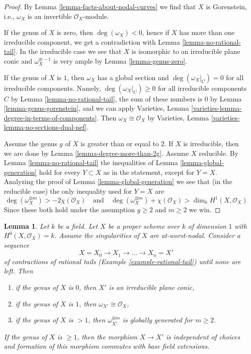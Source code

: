 \documentclass{stacks-project}
\theoremstyle{plain}
\newtheorem{lemma}[subsection]{Lemma}
\theoremstyle{definition}
\theoremstyle{remark}
\numberwithin{equation}{subsection}
\begin{document}
\begin{proof}
By Lemma \ref{lemma-facts-about-nodal-curves} we find that $X$ is
Gorenstein, i.e., $\omega_X$ is an invertible $\mathcal{O}_X$-module.

\medskip\noindent
If the genus of $X$ is zero, then $\deg(\omega_X) < 0$, hence if
$X$ has more than one irreducible component, we get a contradiction
with Lemma \ref{lemma-no-rational-tail}. In the irreducible case
we see that $X$ is isomorphic to an irreducible plane conic and
$\omega_X^{\otimes -1}$ is very ample by Lemma \ref{lemma-genus-zero}.

\medskip\noindent
If the genus of $X$ is $1$, then $\omega_X$ has a global section and
$\deg(\omega_X|_C) = 0$ for all irreducible components.
Namely, $\deg(\omega_X|_C) \geq 0$ for all irreducible components $C$
by Lemma \ref{lemma-no-rational-tail}, the sum of these numbers is
$0$ by Lemma \ref{lemma-genus-gorenstein}, and we can apply
Varieties, Lemma \ref{varieties-lemma-degree-in-terms-of-components}.
Then $\omega_X \cong \mathcal{O}_X$ by
Varieties, Lemma \ref{varieties-lemma-no-sections-dual-nef}.

\medskip\noindent
Assume the genus $g$ of $X$ is greater than or equal to $2$.
If $X$ is irreducible, then we are done by
Lemma \ref{lemma-degree-more-than-2g}.
Assume $X$ reducible.
By Lemma \ref{lemma-no-rational-tail} the
inequalities of Lemma \ref{lemma-global-generation}
hold for every $Y \subset X$ as in the statement, except for
$Y = X$. Analyzing the proof of Lemma \ref{lemma-global-generation}
we see that (in the reducible case) the only inequality
used for $Y = X$ are
$$
\deg(\omega_X^{\otimes m}) > -2 \chi(\mathcal{O}_X)
\quad\text{and}\quad
\deg(\omega_X^{\otimes m}) + \chi(\mathcal{O}_X) > \dim_k H^1(X, \mathcal{O}_X)
$$
Since these both hold under the assumption $g \geq 2$ and $m \geq 2$ we win.
\end{proof}

\begin{lemma}
\label{lemma-contracting-rational-tails}
Let $k$ be a field. Let $X$ be a proper scheme over $k$ of dimension $1$
with $H^0(X, \mathcal{O}_X) = k$. Assume the singularities of $X$ are
at-worst-nodal. Consider a sequence
$$
X = X_0 \to X_1 \to \ldots \to X_n = X'
$$
of contractions of rational tails (Example \ref{example-rational-tail})
until none are left. Then
\begin{enumerate}
\item if the genus of $X$ is $0$, then $X'$ is an irreducible
plane conic,
\item if the genus of $X$ is $1$, then $\omega_{X'} \cong \mathcal{O}_X$,
\item if the genus of $X$ is $> 1$, then
$\omega_{X'}^{\otimes m}$ is globally generated for $m \geq 2$.
\end{enumerate}
If the genus of $X$ is $\geq 1$, then the morphism $X \to X'$
is independent of choices and formation of this morphism
commutes with base field extensions.
\end{lemma}
\end{document}
